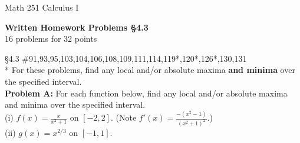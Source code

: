 \documentclass[11pt]{report}
\theoremstyle{plain}
\begin{document}
\hfill Math 251 Calculus I
\begin{center}
\Large{\textbf{Written Homework Problems \S 4.3}} \\
16 problems for 32 points\\
\end{center}

\begin{description}
\item{\S 4.3} \#91,93,95,103,104,106,108,109,111,114,119*,120*,126*,130,131\\

* For these problems, find any local and/or absolute maxima \textbf{and minima} over the specified interval.\\

\textbf{Problem A:} For each function below, find any local and/or absolute maxima and minima over the specified interval.\\

(i) $f(x)=\frac{x}{x^2+1}$ on $[-2,2].$ (Note $f'(x)=\frac{-(x^2-1)}{(x^2+1)^2}.$)
\\

(ii) $g(x)=x^{2/3}$ on $[-1,1].$


\end{description}
\end{document}
